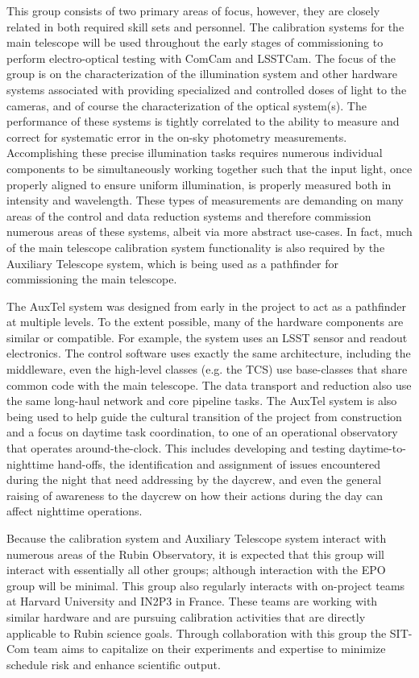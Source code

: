 \documentclass[SE,lsstdraft,authoryear,toc]{lsstdoc}
\begin{document}
This group consists of two primary areas of focus, however, they are closely related in both required skill sets and personnel.
The calibration systems for the main telescope will be used throughout the early stages of commissioning to perform electro-optical testing with ComCam and LSSTCam.
The focus of the group is on the characterization of the illumination system and other hardware systems associated with providing specialized and controlled doses of light to the cameras, and of course the characterization of the optical system(s).
The performance of these systems is tightly correlated to the ability to measure and correct for systematic error in the on-sky photometry measurements.
Accomplishing these precise illumination tasks requires numerous individual components to be simultaneously working together such that the input light, once properly aligned to ensure uniform illumination, is properly measured both in intensity and wavelength.
These types of measurements are demanding on many areas of the control and data reduction systems and therefore commission numerous areas of these systems, albeit via more abstract use-cases.
In fact, much of the main telescope calibration system functionality is also required by the Auxiliary Telescope system, which is being used as a pathfinder for commissioning the main telescope.

The AuxTel system was designed from early in the project to act as a pathfinder at multiple levels.
To the extent possible, many of the hardware components are similar or compatible.
For example, the system uses an LSST sensor and readout electronics. The control software uses exactly the same architecture, including the middleware, even the high-level classes (e.g. the TCS) use base-classes that share common code with the main telescope.
The data transport and reduction also use the same long-haul network and core pipeline tasks.
The AuxTel system is also being used to help guide the cultural transition of the project from construction and a focus on daytime task coordination, to one of an operational observatory that operates around-the-clock.
This includes developing and testing daytime-to-nighttime hand-offs, the identification and assignment of issues encountered during the night that need addressing by the daycrew, and even the general raising of awareness to the daycrew on how their actions during the day can affect nighttime operations.

Because the calibration system and Auxiliary Telescope system interact with numerous areas of the Rubin Observatory, it is expected that this group will interact with essentially all other groups; although interaction with the EPO group will be minimal.
This group also regularly interacts with on-project teams at Harvard University and IN2P3 in France.
These teams are working with similar hardware and are pursuing calibration activities that are directly applicable to Rubin science goals.
Through collaboration with this group the SIT-Com team aims to capitalize on their experiments and expertise to minimize schedule risk and enhance scientific output.
\end{document}
